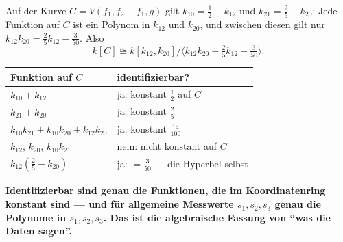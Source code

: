 \begin{merksatz}
Auf der Kurve $C = V(f_1, f_2 - f_1, g)$ gilt $k_{10} = \tfrac12 - k_{12}$ und $k_{21} = \tfrac25 - k_{20}$: Jede Funktion auf $C$ ist ein Polynom in $k_{12}$ und $k_{20}$, und zwischen diesen gilt nur $k_{12}k_{20} = \tfrac25k_{12} - \tfrac{3}{50}$. Also
\[ k[C]\cong k[k_{12}, k_{20}]\big/\langle k_{12}k_{20} - \tfrac25k_{12} + \tfrac{3}{50}\rangle . \]

\begin{center}
{\small
\renewcommand{\arraystretch}{1.5}
\begin{tabular}{@{}P{3.6cm}P{5.0cm}@{}}
\toprule
\textbf{Funktion auf $C$} & \textbf{identifizierbar?}\\
\midrule
$k_{10} + k_{12}$ & ja: konstant $\tfrac12$ auf $C$\\
$k_{21} + k_{20}$ & ja: konstant $\tfrac25$\\
$k_{10}k_{21} + k_{10}k_{20} + k_{12}k_{20}$ & ja: konstant $\tfrac{14}{100}$\\
$k_{12}$, $k_{20}$, $k_{10}k_{21}$ & nein: nicht konstant auf $C$\\
$k_{12}(\tfrac25 - k_{20})$ & ja: $= \tfrac{3}{50}$ --- die Hyperbel selbst\\
\bottomrule
\end{tabular}}
\end{center}

\begin{center}
\begin{minipage}{0.9\textwidth}
\textbf{Identifizierbar sind genau die Funktionen, die im Koordinatenring konstant sind --- und für allgemeine Messwerte $s_1, s_2, s_3$ genau die Polynome in $s_1, s_2, s_3$. Das ist die algebraische Fassung von \enquote{was die Daten sagen}.}
\end{minipage}
\end{center}

\begin{center}
\begin{minipage}{0.88\textwidth}
\end{minipage}
\end{center}
\end{merksatz}

